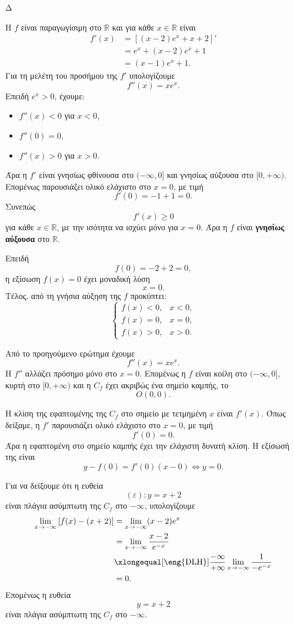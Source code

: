 \begin{thema}{Δ}
\begin{erwthma}
\item Η $f$ είναι παραγωγίσιμη στο $\mathbb{R}$ και για κάθε $x\in\mathbb{R}$ είναι
\begin{align*}
f'(x)
&=\left[(x-2)e^x+x+2\right]'\\
&=e^x+(x-2)e^x+1\\
&=(x-1)e^x+1.
\end{align*}
Για τη μελέτη του προσήμου της $f'$ υπολογίζουμε
\[
f''(x)=xe^x.
\]
Επειδή $e^x>0$, έχουμε:
\begin{itemize}
\item $f''(x)<0$ για $x<0$,
\item $f''(0)=0$,
\item $f''(x)>0$ για $x>0$.
\end{itemize}
Άρα η $f'$ είναι γνησίως φθίνουσα στο $(-\infty,0]$ και γνησίως αύξουσα στο $[0,+\infty)$. Επομένως παρουσιάζει ολικό ελάχιστο στο $x=0$, με τιμή
\[
f'(0)=-1+1=0.
\]
Συνεπώς
\[
f'(x)\geq0
\]
για κάθε $x\in\mathbb{R}$, με την ισότητα να ισχύει μόνο για $x=0$. Άρα η $f$ είναι \textbf{γνησίως αύξουσα} στο $\mathbb{R}$.

Επειδή
\[
f(0)=-2+2=0,
\]
η εξίσωση $f(x)=0$ έχει μοναδική λύση
\[
{x=0}.
\]
Τέλος, από τη γνήσια αύξηση της $f$ προκύπτει:
\[
{
\begin{cases}
f(x)<0, & x<0,\\
f(x)=0, & x=0,\\
f(x)>0, & x>0.
\end{cases}}
\]

\item Από το προηγούμενο ερώτημα έχουμε
\[
f''(x)=xe^x.
\]
Η $f''$ αλλάζει πρόσημο μόνο στο $x=0$. Επομένως η $f$ είναι κοίλη στο $(-\infty,0]$, κυρτή στο $[0,+\infty)$ και η $C_f$ έχει ακριβώς ένα σημείο καμπής, το
\[
{O(0,0)}.
\]

Η κλίση της εφαπτομένης της $C_f$ στο σημείο με τετμημένη $x$ είναι $f'(x)$. Όπως δείξαμε, η $f'$ παρουσιάζει ολικό ελάχιστο στο $x=0$, με τιμή
\[
f'(0)=0.
\]
Άρα η εφαπτομένη στο σημείο καμπής έχει την ελάχιστη δυνατή κλίση. Η εξίσωσή της είναι
\[
y-f(0)=f'(0)(x-0)
\Leftrightarrow
{y=0}.
\]

\item Για να δείξουμε ότι η ευθεία
\[
(\varepsilon):y=x+2
\]
είναι πλάγια ασύμπτωτη της $C_f$ στο $-\infty$, υπολογίζουμε
\begin{align*}
\lim_{x\to-\infty}\left[f(x)-(x+2)\right]
&=\lim_{x\to-\infty}(x-2)e^x\\
&=\lim_{x\to-\infty}\frac{x-2}{e^{-x}}\\
&\xlongequal[\text{\eng{DLH}}]{\frac{-\infty}{+\infty}}
\lim_{x\to-\infty}\frac{1}{-e^{-x}}\\
&=0.
\end{align*}
Επομένως η ευθεία
\[
{y=x+2}
\]
είναι πλάγια ασύμπτωτη της $C_f$ στο $-\infty$.


\end{erwthma}
\end{thema}
